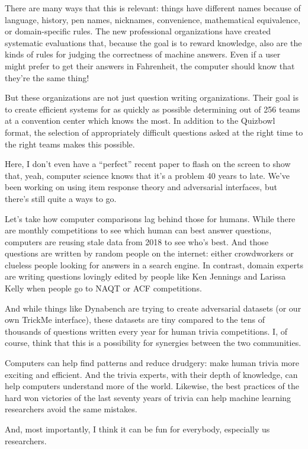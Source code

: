 There are many ways that this is relevant: things have different names because of language, history, pen names, nicknames, convenience, mathematical equivalence, or domain-specific rules.  The new professional organizations have created systematic evaluations that, because the goal is to reward knowledge, also are the kinds of rules for judging the correctness of machine answers.  Even if a user might prefer to get their answers in Fahrenheit, the computer should know that they’re the same thing!

But these organizations are not just question writing organizations.  Their goal is to create efficient systems for as quickly as possible determining out of 256 teams at a convention center which knows the most.  In addition to the Quizbowl format, the selection of appropriately difficult questions asked at the right time to the right teams makes this possible.

Here, I don’t even have a “perfect” recent paper to flash on the screen to show that, yeah, computer science knows that it’s a problem 40 years to late.  We’ve been working on using item response theory and adversarial interfaces, but there’s still quite a ways to go.  

Let’s take how computer comparisons lag behind those for humans.  While there are monthly competitions to see which human can best answer questions, computers are reusing stale data from 2018 to see who’s best.  And those questions are written by random people on the internet: either crowdworkers or clueless people looking for answers in a search engine.  In contrast, domain experts are writing questions lovingly edited by people like Ken Jennings and Larissa Kelly when people go to NAQT or ACF competitions.  

And while things like Dynabench are trying to create adversarial datasets (or our own TrickMe interface), these datasets are tiny compared to the tens of thousands of questions written every year for human trivia competitions.  I, of course, think that this is a possibility for synergies between the two communities.

Computers can help find patterns and reduce drudgery: make human trivia more exciting and efficient.  And the trivia experts, with their depth of knowledge, can help computers understand more of the world.  Likewise, the best practices of the hard won victories of the last seventy years of trivia can help machine learning researchers avoid the same mistakes.

And, most importantly, I think it can be fun for everybody, especially us researchers.
 


